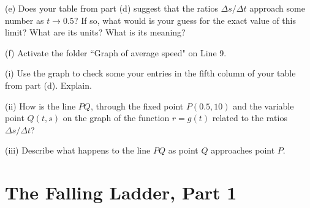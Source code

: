 \documentclass{ximera}
\begin{document}
\begin{example}
(e) Does  your table from part (d) suggest that the ratios $\Delta s/ \Delta t$ approach some number as $t\to 0.5$? If so, what would is your guess for the exact value of this limit? What are its units? What is its meaning?

(f) Activate the folder ``Graph of average speed" on Line 9. 

(i) Use the graph to check some your entries in the fifth column of your table from part (d). Explain.

(ii) How is the line $PQ$, through the fixed point $P(0.5,10)$ and the variable point $Q(t,s)$ on the graph of the function $r=g(t)$ related to the ratios $\Delta s / \Delta t$?

(iii) Describe what happens to the line $PQ$ as point $Q$ approaches point $P$.



\end{example}


\section{The Falling Ladder, Part 1}
\end{document}
